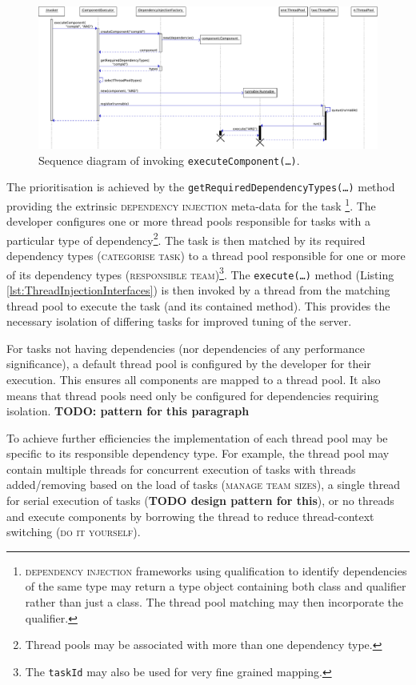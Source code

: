 \documentclass[prodmode]{style/acmlarge}
\begin{document}
\begin{figure}[!t]
\centering
\includegraphics[width=6in]{ExecuteComponentSequenceDiagram}
\caption{Sequence diagram of invoking \texttt{executeComponent(\ldots)}.}
\label{fig:ExecuteComponentSequenceDiagram}
\end{figure}

The prioritisation is achieved by the
\texttt{getRequiredDependencyTypes(\ldots)} method providing the extrinsic
\textsc{dependency injection} \cite{ioc} meta-data for the task
\footnote{\textsc{dependency injection} frameworks using qualification to
identify dependencies of the same type may return a type object containing both
class and qualifier rather than just a class.  The thread pool matching may then
incorporate the qualifier.}.  The developer configures one or more thread pools
responsible for tasks with a particular type of dependency\footnote{Thread pools
may be associated with more than one dependency type.}.  The task is then
matched by its required dependency types (\textsc{categorise task}) to a thread
pool responsible for one or more of its dependency types (\textsc{responsible
team})\footnote{The \texttt{taskId} may also be used for very fine grained
mapping.}.  The \texttt{execute(\ldots)} method (Listing
\ref{lst:ThreadInjectionInterfaces}) is then invoked by a thread from the
matching thread pool to execute the task (and its contained method). This
provides the necessary isolation of differing tasks for improved tuning of the
server.

For tasks not having dependencies (nor dependencies of any performance
significance), a default thread pool is configured by the developer for their
execution.  This ensures all components are mapped to a thread pool.  It also
means that thread pools need only be configured for dependencies requiring
isolation. \textbf{TODO: pattern for this paragraph}

To achieve further efficiencies the implementation of each thread pool may be
specific to its responsible dependency type.  For example, the thread pool may
contain multiple threads for concurrent execution of tasks with threads
added/removing based on the load of tasks (\textsc{manage team sizes}), a single
thread for serial execution of tasks (\textbf{TODO design pattern for this}), or
no threads and execute components by borrowing the thread to reduce
thread-context switching (\textsc{do it yourself}).
\end{document}
